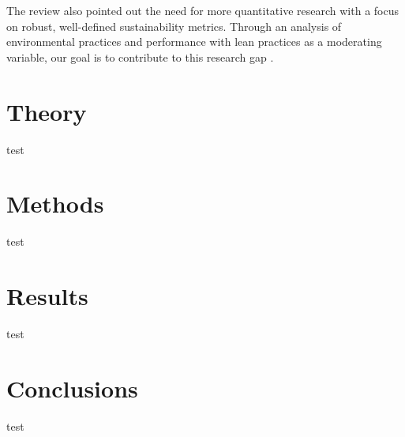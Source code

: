 \documentclass[]{article}
\begin{document}
The review also pointed out the need for more quantitative research with a focus on robust, well-defined sustainability metrics. Through an analysis of environmental practices and performance with lean practices as a moderating variable, our goal is to contribute to this research gap \citep{abualfaraaLeanGreenManufacturingPractices2020}.
    
\section{Theory}
test

\section{Methods}
test

\section{Results}
test

\section{Conclusions}
test


\end{document}
